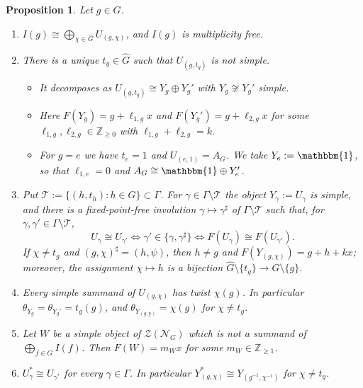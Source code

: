 \documentclass[10pt]{article}
\theoremstyle{plain}
\newtheorem{proposition}[theorem]{Proposition}
\theoremstyle{definition}
\theoremstyle{plain}
\begin{document}
\begin{proposition}\label{prop:local}
Let $g\in G$.
\begin{enumerate}
\item $I(g)\cong\bigoplus_{\chi\in\widehat{G}}U_{(g,\chi)}$, and $I(g)$ is multiplicity free.
\item There is a unique $t_g\in\widehat{G}$ such that $U_{(g,t_g)}$ is not simple.
\begin{itemize}
\item It decomposes as $U_{(g,t_g)}\cong Y_g\oplus Y_g'$ with $Y_g\not\cong Y_g'$ simple.
\item Here $F(Y_g)=g+\ell_{1,g}x$ and $F(Y_g')=g+\ell_{2,g}x$ for some $\ell_{1,g},\ell_{2,g}\in\mathbb{Z}_{\geq0}$ with $\ell_{1,g}+\ell_{2,g}=k$.
\item For $g=e$ we have $t_e=1$ and $U_{(e,1)}=A_G$. We take $Y_e:=\mathbbm{1}$, so that $\ell_{1,e}=0$ and $A_G\cong\mathbbm{1}\oplus Y_e'$.
\end{itemize}
\item Put $\mathcal{T}:=\{(h,t_h):h\in G\}\subset\Gamma$. For $\gamma\in\Gamma\setminus\mathcal{T}$ the object $Y_\gamma:=U_\gamma$ is simple, and there is a fixed-point-free involution $\gamma\mapsto\gamma^\sharp$ of $\Gamma\setminus\mathcal{T}$ such that, for $\gamma,\gamma'\in\Gamma\setminus\mathcal{T}$,
\[
U_\gamma\cong U_{\gamma'}\iff\gamma'\in\{\gamma,\gamma^\sharp\}\iff F(U_\gamma)\cong F(U_{\gamma'}).
\]
If $\chi\neq t_g$ and $(g,\chi)^\sharp=(h,\psi)$, then $h\neq g$ and $F(Y_{(g,\chi)})=g+h+kx$; moreover, the assignment $\chi\mapsto h$ is a bijection $\widehat{G}\setminus\{t_g\}\to G\setminus\{g\}$.
\item Every simple summand of $U_{(g,\chi)}$ has twist $\chi(g)$. In particular $\theta_{Y_g}=\theta_{Y_g'}=t_g(g)$, and $\theta_{Y_{(g,\chi)}}=\chi(g)$ for $\chi\neq t_g$.
\item Let $W$ be a simple object of $\mathcal{Z}(\mathcal{N}_G)$ which is not a summand of $\bigoplus_{f\in G}I(f)$. Then $F(W)=m_Wx$ for some $m_W\in\mathbb{Z}_{\geq1}$.
\item $U_\gamma^\ast\cong U_{\gamma^\ast}$ for every $\gamma\in\Gamma$. In particular $Y_{(g,\chi)}^\ast\cong Y_{(g^{-1},\chi^{-1})}$ for $\chi\neq t_g$.
\end{enumerate}
\end{proposition}
\end{document}
